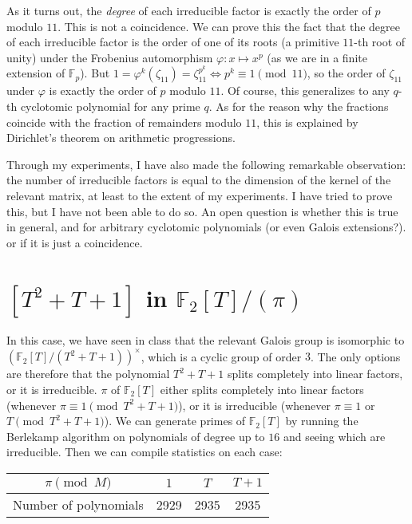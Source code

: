 \documentclass[11pt]{article}
\theoremstyle{definition}
\begin{document}
    \noindent As it turns out, the \emph{degree} of each irreducible factor is exactly the order of $p$ modulo $11$.
    This is not a coincidence.
    We can prove this the fact that the degree of each irreducible factor is the order of one of its roots (a primitive $11$-th root of unity)
    under the Frobenius automorphism $\varphi: x \mapsto x^p$
    (as we are in a finite extension of $\mathbb{F}_p$). But $1 = \varphi^{k}(\zeta_{11}) = \zeta_{11}^{p^k} \iff p^k \equiv 1 \pmod{11}$,
    so the order of $\zeta_{11}$ under $\varphi$ is exactly the order of $p$ modulo $11$.
    Of course, this generalizes to any $q$-th cyclotomic polynomial for any prime $q$.
    As for the reason why the fractions coincide with the fraction of remainders modulo $11$,
    this is explained by Dirichlet's theorem on arithmetic progressions.

    \noindent Through my experiments, I have also made the following remarkable observation:
    the number of irreducible factors is equal to the
    dimension of the kernel of the relevant matrix,
    at least to the extent of my experiments.
    I have tried to prove this, but I have not been able to do so.
    An open question is whether this is true in general,
    and for arbitrary cyclotomic polynomials (or even Galois extensions?).
    or if it is just a coincidence.

    \section{$[T^2 + T + 1]$ in $\mathbb{F}_2[T] / (\pi)$}

    In this case, we have seen in class that the relevant Galois group is isomorphic to \linebreak
    ${(\mathbb{F}_2[T]/(T^2+T+1))^{\times}}$,
    which is a cyclic group of order $3$.
    The only options are therefore that the polynomial $T^2 + T + 1$ splits completely into linear factors, or it is irreducible.
    $\pi$ of $\mathbb{F}_2[T]$ either
    splits completely into linear factors (whenever $\pi \equiv 1 \pmod{T^2 + T + 1}$), or it is irreducible (whenever $\pi \equiv 1$ or $T \pmod{T^2 + T + 1}$).
    We can generate primes of $\mathbb{F}_2[T]$ by running the Berlekamp algorithm on polynomials of degree up to $16$ and seeing which are irreducible.
    Then we can compile statistics on each case:

    \begin{center}
        \begin{tabular}{|c|c|c|c|}
            \hline
            $\pi \pmod M$  & $1$ & $T$ & $T + 1$ \\
            \hline
             Number of polynomials & 2929 & 2935 & 2935 \\
            \hline
        \end{tabular}
    \end{center}
\end{document}
